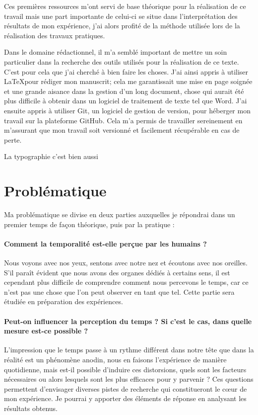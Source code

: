 \documentclass[12pt,fleqn,oneside,french,openany]{book} %
\begin{document}
Ces premières ressources m'ont servi de base théorique pour la réalisation de ce travail mais une part importante de celui-ci se situe dans l'interprétation des résultats de mon expérience, j'ai alors profité de la méthode utilisée lors de la réalisation des travaux pratiques. 

Dans le domaine rédactionnel, il m'a semblé important de mettre un soin particulier dans la recherche des outils utilisés pour la réalisation de ce texte. C'est pour cela que j'ai cherché à bien faire les choses. J'ai ainsi appris à utiliser \LaTeX pour rédiger mon manuscrit; cela me garantissait une mise en page soignée et une grande aisance dans la gestion d'un long document, chose qui aurait été plus difficile à obtenir dans un logiciel de traitement de texte tel que Word. J'ai ensuite appris à utiliser Git, un logiciel de gestion de version, pour héberger mon travail sur la plateforme GitHub. Cela m'a permis de travailler sereinement en m'assurant que mon travail soit versionné et facilement récupérable en cas de perte.

La typographie c'est bien aussi \cite{typo}

\section{Problématique} \label{sec:problematique}
Ma problématique se divise en deux parties auxquelles je répondrai dans un premier temps de façon théorique, puis par la pratique :

\paragraph{Comment la temporalité est-elle perçue par les humains ?} Nous voyons avec nos yeux, sentons avec notre nez et écoutons avec nos oreilles. S'il paraît évident que nous avons des organes dédiés à certains sens, il est cependant plus difficile de comprendre comment nous percevons le temps, car ce n'est pas une chose que l'on peut observer en tant que tel. Cette partie sera étudiée en préparation des expériences. 

\paragraph{Peut-on influencer la perception du temps ? Si c'est le cas, dans quelle mesure est-ce possible ?} L'impression que le temps passe à un rythme différent dans notre tête que dans la réalité est un phénomène anodin, nous en faisons l'expérience de manière quotidienne, mais est-il possible d'induire ces distorsions, quels sont les facteurs nécessaires ou alors lesquels sont les plus efficaces pour y parvenir ? Ces questions permettent d'envisager diverses pistes de recherche qui constitueront le cœur de mon expérience. Je pourrai y apporter des éléments de réponse en analysant les résultats obtenus. %
\end{document}
